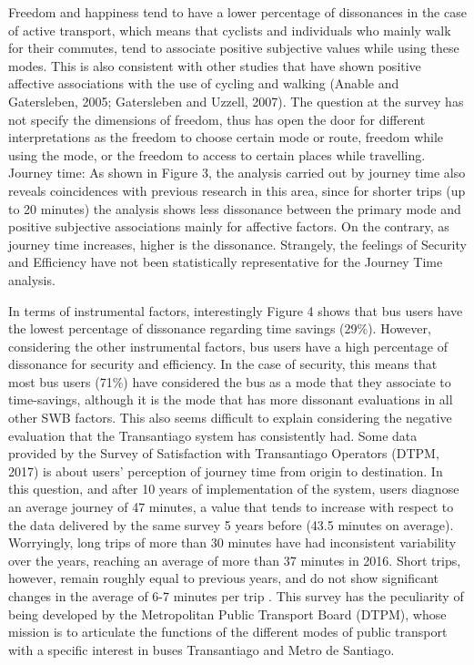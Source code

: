 \documentclass[]{elsarticle} %
\begin{document}
Freedom and happiness tend to have a lower percentage of dissonances in
the case of active transport, which means that cyclists and individuals
who mainly walk for their commutes, tend to associate positive
subjective values while using these modes. This is also consistent with
other studies that have shown positive affective associations with the
use of cycling and walking (Anable and Gatersleben, 2005; Gatersleben
and Uzzell, 2007). The question at the survey has not specify the
dimensions of freedom, thus has open the door for different
interpretations as the freedom to choose certain mode or route, freedom
while using the mode, or the freedom to access to certain places while
travelling. Journey time: As shown in Figure 3, the analysis carried out
by journey time also reveals coincidences with previous research in this
area, since for shorter trips (up to 20 minutes) the analysis shows less
dissonance between the primary mode and positive subjective associations
mainly for affective factors. On the contrary, as journey time
increases, higher is the dissonance. Strangely, the feelings of Security
and Efficiency have not been statistically representative for the
Journey Time analysis.

In terms of instrumental factors, interestingly Figure 4 shows that bus
users have the lowest percentage of dissonance regarding time savings
(29\%). However, considering the other instrumental factors, bus users
have a high percentage of dissonance for security and efficiency. In the
case of security, this means that most bus users (71\%) have considered
the bus as a mode that they associate to time-savings, although it is
the mode that has more dissonant evaluations in all other SWB factors.
This also seems difficult to explain considering the negative evaluation
that the Transantiago system has consistently had. Some data provided by
the Survey of Satisfaction with Transantiago Operators (DTPM, 2017) is
about users' perception of journey time from origin to destination. In
this question, and after 10 years of implementation of the system, users
diagnose an average journey of 47 minutes, a value that tends to
increase with respect to the data delivered by the same survey 5 years
before (43.5 minutes on average). Worryingly, long trips of more than 30
minutes have had inconsistent variability over the years, reaching an
average of more than 37 minutes in 2016. Short trips, however, remain
roughly equal to previous years, and do not show significant changes in
the average of 6-7 minutes per trip . This survey has the peculiarity of
being developed by the Metropolitan Public Transport Board (DTPM), whose
mission is to articulate the functions of the different modes of public
transport with a specific interest in buses Transantiago and Metro de
Santiago.
\end{document}
